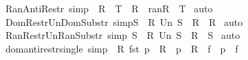 \begin{isabellebody}
{\isafoldproof}%
%
\isadelimproof
\isanewline
%
\endisadelimproof
\isanewline
{}\isamarkupfalse%
\ Ran{\isacharunderscore}Anti{\isacharunderscore}Restr\ {\isacharbrackleft}simp{\isacharbrackright}{\isacharcolon}\ \ {\isachardoublequoteopen}{\isacharparenleft}R\ {\isacharcolon}{\isacharminus}{\isachargreater}\ T{\isacharparenright}\ {\isacharequal}\ R\ {\isacharcolon}{\isachargreater}\ {\isacharparenleft}ran{\isacharparenleft}R{\isacharparenright}\ {\isacharminus}\ T{\isacharparenright}{\isachardoublequoteclose}\isanewline
%
\isadelimproof
%
\endisadelimproof
%
\isatagproof
{}\isamarkupfalse%
\ auto\isanewline
{}\isamarkupfalse%
%
\endisatagproof
{\isafoldproof}%
%
\isadelimproof
\isanewline
%
\endisadelimproof
\isanewline
{}\isamarkupfalse%
\ DomRestr{\isacharunderscore}Un{\isacharunderscore}DomSubstr\ {\isacharbrackleft}simp{\isacharbrackright}{\isacharcolon}{\isachardoublequoteopen}{\isacharparenleft}S\ {\isacharless}{\isacharcolon}\ R{\isacharparenright}\ Un\ {\isacharparenleft}S\ {\isacharless}{\isacharminus}{\isacharcolon}\ R{\isacharparenright}\ {\isacharequal}\ R{\isachardoublequoteclose}\isanewline
%
\isadelimproof
%
\endisadelimproof
%
\isatagproof
{}\isamarkupfalse%
\ auto\isanewline
{}\isamarkupfalse%
%
\endisatagproof
{\isafoldproof}%
%
\isadelimproof
\isanewline
%
\endisadelimproof
\isanewline
{}\isamarkupfalse%
\ RanRestr{\isacharunderscore}Un{\isacharunderscore}RanSubstr\ {\isacharbrackleft}simp{\isacharbrackright}{\isacharcolon}\ {\isachardoublequoteopen}{\isacharparenleft}S\ {\isacharcolon}{\isachargreater}\ R{\isacharparenright}\ Un\ {\isacharparenleft}S\ {\isacharcolon}{\isacharminus}{\isachargreater}\ R{\isacharparenright}\ {\isacharequal}\ S{\isachardoublequoteclose}\isanewline
%
\isadelimproof
%
\endisadelimproof
%
\isatagproof
{}\isamarkupfalse%
\ auto\isanewline
{}\isamarkupfalse%
%
\endisatagproof
{\isafoldproof}%
%
\isadelimproof
\isanewline
%
\endisadelimproof
\isanewline
{}\isamarkupfalse%
\ dom{\isacharunderscore}anti{\isacharunderscore}restr{\isacharunderscore}single\ {\isacharbrackleft}simp{\isacharbrackright}{\isacharcolon}\ {\isachardoublequoteopen}{\isacharbang}{\isacharbang}\ R{\isachardot}\ fst\ p\ {\isachartilde}{\isacharcolon}\ R\ {\isacharequal}{\isacharequal}{\isachargreater}\ p\ {\isacharcolon}\ R\ {\isacharless}{\isacharminus}{\isacharcolon}\ f\ {\isacharequal}\ {\isacharparenleft}p\ {\isacharcolon}\ f{\isacharparenright}{\isachardoublequoteclose}\isanewline

\end{isabellebody}
